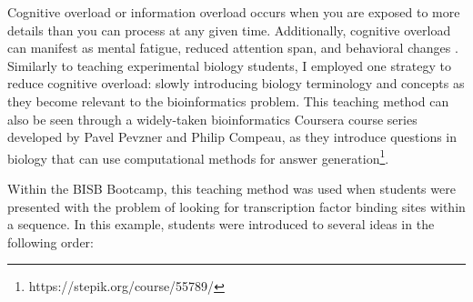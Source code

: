 Cognitive overload or information overload occurs when you are exposed to more details than you can process at any given time. Additionally, cognitive overload can manifest as mental fatigue, reduced attention span, and behavioral changes \cite{koc-januchta2022,ehrmann2022,fox2007,kirsh2000a}. Similarly to teaching experimental biology students, I employed one strategy to reduce cognitive overload: slowly introducing biology terminology and concepts as they become relevant to the bioinformatics problem. This teaching method can also be seen through a widely-taken bioinformatics Coursera course series developed by Pavel Pevzner and Philip Compeau, as they introduce questions in biology that can use computational methods for answer generation\footnote{https://stepik.org/course/55789/}. 

Within the BISB Bootcamp, this teaching method was used when students were presented with the problem of looking for transcription factor binding sites within a sequence. In this example, students were introduced to several ideas in the following order: 

\par\noindent\dotfill

